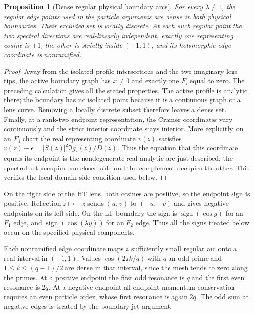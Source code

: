 \documentclass[11pt]{article}
\numberwithin{equation}{section}
\newtheorem{proposition}[theorem]{Proposition}
\theoremstyle{definition}
\begin{document}
\begin{proposition}[Dense regular physical boundary arcs]
\label{prop:regular_dense}
For every $\lambda\ne1$, the regular edge points used in the
particle arguments are dense in both physical boundaries.
Their excluded set is locally discrete.  At each such regular
point the two spectral directions are real-linearly independent,
exactly one representing cosine is $\pm1$, the other is strictly
inside $(-1,1)$, and its holomorphic edge coordinate is nonramified.
\end{proposition}
\begin{proof}
Away from the isolated profile intersections and the two imaginary
lens tips, the active boundary graph has $x\ne0$ and exactly one
$F_i$ equal to zero.  The preceding calculation gives all the stated
properties.  The active profile is analytic there; the boundary
has no isolated point because it is a continuous graph or a lens
curve.  Removing a locally discrete subset therefore leaves a dense
set.  Finally, at a rank-two endpoint representation, the Cramer
coordinates vary continuously and the strict interior coordinate
stays interior.  More explicitly, on an $F_1$ chart the real
representing coordinate $v(z)$ satisfies
$v(z)-\epsilon=|S(z)|^2\Im g_\epsilon(z)/D(z)$.
Thus the equation that this coordinate equals its endpoint is the
nondegenerate real analytic arc just described;
the spectral set occupies one closed side and the complement
occupies the other.  This verifies the local domain-side condition
used below.
\end{proof}

On the right side of the HT lens, both cosines are positive, so
the endpoint sign is positive.  Reflection $z\mapsto-\overline z$
sends $(u,v)$ to $(-u,-v)$ and gives negative endpoints on its left
side.  On the LT boundary the sign is $\operatorname{sign}(\cos y)$
for an $F_1$ edge, and $\operatorname{sign}(\cos(\lambda y))$ for
an $F_2$ edge.  Thus all the signs treated below occur on the
specified physical components.

Each nonramified edge coordinate maps a sufficiently small regular
arc onto a real interval in $(-1,1)$.  Values
$\cos(2\pi k/q)$ with $q$ an odd prime and
$1\le k\le(q-1)/2$ are dense in that interval, since the mesh
tends to zero along the primes.  At a positive endpoint the first
odd resonance is $q$ and the first even resonance is $2q$.
At a negative endpoint all-endpoint momentum conservation requires
an even particle order, whose first resonance is again $2q$.
The odd sum at negative edges is treated by the boundary-jet argument.
\end{document}
